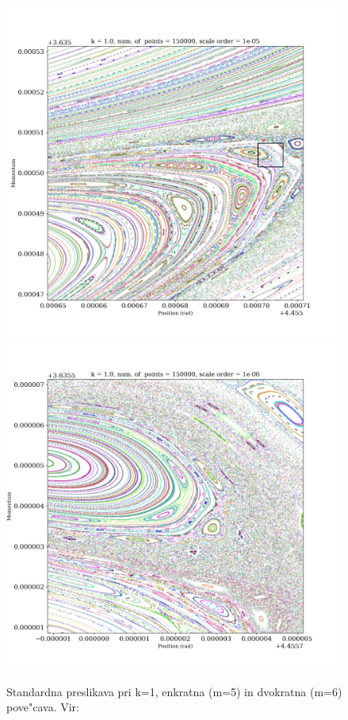 \documentclass[]{article}
\begin{document}
\begin{figure}[!htb]
	\begin{center}
		\includegraphics[width = 11cm]{stdmap6}
		\includegraphics[width = 11cm]{stdmap7}
		\caption{Standardna preslikava pri k=1, enkratna (m=5) in dvokratna (m=6) pove"cava. Vir: \cite{1}}
		\label{slika 9}
	\end{center}
\end{figure}
\clearpage
\end{document}
